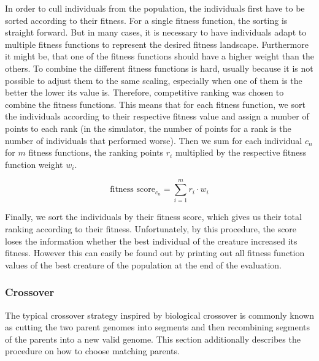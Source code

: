 \documentclass[main]{subfiles}
\begin{document}
In order to cull individuals from the population, the individuals first have to be sorted according to their fitness. For a single fitness function, the sorting is straight forward. But in many cases, it is necessary to have individuals adapt to multiple fitness functions to represent the desired fitness landscape. Furthermore it might be, that one of the fitness functions should have a higher weight than the others. To combine the different fitness functions is hard, usually because it is not possible to adjust them to the same scaling, especially when one of them is the better the lower its value is. Therefore, competitive ranking was chosen to combine the fitness functions. This means that for each fitness function, we sort the individuals according to their respective fitness value and assign a number of points to each rank (in the simulator, the number of points for a rank is the number of individuals that performed worse). Then we sum for each individual $c_n$ for $m$ fitness functions, the ranking points $r_i$ multiplied by the respective fitness function weight $w_i$. 

\[\text{fitness score}_{c_n} = \sum\limits^m_{i=1} r_i \cdot w_i \]

Finally, we sort the individuals by their fitness score, which gives us their total ranking according to their fitness. Unfortunately, by this procedure, the score loses the information whether the best individual of the creature increased its fitness. However this can easily be found out by printing out all fitness function values of the best creature of the population at the end of the evaluation.

\subsubsection{Crossover}
\label{subsec:crossover}

The typical crossover strategy inspired by biological crossover is commonly known as cutting the two parent genomes into segments and then recombining segments of the parents into a new valid genome. This section additionally describes the procedure on how to choose matching parents.
\end{document}
